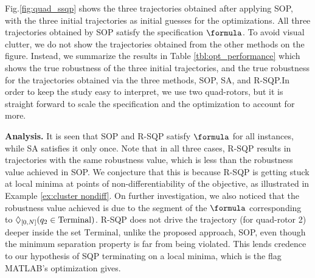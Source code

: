 Fig.\ref{fig:quad_ssqp} shows the three trajectories obtained after applying SOP,
with the three initial trajectories as initial guesses for the optimizations. 
All three trajectories obtained by SOP satisfy the specification $\formula$. 
To avoid visual clutter, we do not show the trajectories obtained from the other methods on the figure.
Instead, we summarize the results in Table \ref{tbl:opt_performance} which shows the true robustness of the three initial trajectories, and the true robustness for the trajectories obtained via the three methods, SOP, SA, and R-SQP.In order to keep the study easy to interpret, we use two quad-rotors, but it is straight forward to scale the specification and the optimization to account for more. 


\textbf{Analysis.} It is seen that SOP and R-SQP satisfy $\formula$ for all instances, while SA satisfies it only once.
Note that in all three cases, R-SQP results in trajectories with the same robustness value, which is less than the robustness value achieved in SOP.
We conjecture that this is because R-SQP is getting stuck at local minima at points of non-differentiability of the objective, as illustrated in Example \ref{ex:cluster nondiff}.
On further investigation, we also noticed that the robustness value achieved is due to the segment of the $\formula$ corresponding to $\Diamond_{[0,N]}(q_2 \in \text{Terminal})$. R-SQP does not drive the trajectory (for quad-rotor 2) deeper inside the set $\text{Terminal}$, unlike the proposed approach, SOP, even though the minimum separation property is far from being violated. This lends credence to our hypothesis of SQP terminating on a local minima, which is the flag MATLAB's optimization gives.


